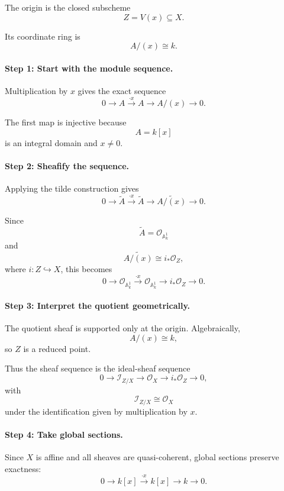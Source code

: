 \documentclass[12pt,a4paper]{article}
\theoremstyle{notespace}
\begin{document}
The origin is the closed subscheme
\[
Z=V(x)\subseteq X.
\]

Its coordinate ring is
\[
A/(x)\cong k.
\]

\paragraph{Step 1: Start with the module sequence.}

Multiplication by \(x\) gives the exact sequence
\[
0
\longrightarrow
A
\xrightarrow{\cdot x}
A
\longrightarrow
A/(x)
\longrightarrow
0.
\]

The first map is injective because
\[
A=k[x]
\]
is an integral domain and \(x\neq 0\).

\paragraph{Step 2: Sheafify the sequence.}

Applying the tilde construction gives
\[
0
\longrightarrow
\widetilde{A}
\xrightarrow{\cdot x}
\widetilde{A}
\longrightarrow
\widetilde{A/(x)}
\longrightarrow
0.
\]

Since
\[
\widetilde{A}=\mathcal{O}_{\mathbb{A}^{1}_{k}}
\]
and
\[
\widetilde{A/(x)}
\cong
i_{*}\mathcal{O}_{Z},
\]
where \(i:Z\hookrightarrow X\), this becomes
\[
0
\longrightarrow
\mathcal{O}_{\mathbb{A}^{1}_{k}}
\xrightarrow{\cdot x}
\mathcal{O}_{\mathbb{A}^{1}_{k}}
\longrightarrow
i_{*}\mathcal{O}_{Z}
\longrightarrow
0.
\]

\paragraph{Step 3: Interpret the quotient geometrically.}

The quotient sheaf is supported only at the origin. Algebraically,
\[
A/(x)\cong k,
\]
so \(Z\) is a reduced point.

Thus the sheaf sequence is the ideal-sheaf sequence
\[
0
\longrightarrow
\mathcal{I}_{Z/X}
\longrightarrow
\mathcal{O}_{X}
\longrightarrow
i_{*}\mathcal{O}_{Z}
\longrightarrow
0,
\]
with
\[
\mathcal{I}_{Z/X}\cong \mathcal{O}_{X}
\]
under the identification given by multiplication by \(x\).

\paragraph{Step 4: Take global sections.}

Since \(X\) is affine and all sheaves are quasi-coherent, global sections
preserve exactness:
\[
0
\longrightarrow
k[x]
\xrightarrow{\cdot x}
k[x]
\longrightarrow
k
\longrightarrow
0.
\]
\end{document}
